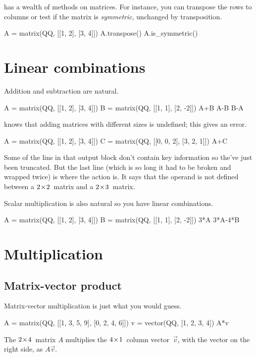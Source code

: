 \Sage{} has a wealth of methods on matrices.
For instance, you can transpose the rows to columns or test if the 
matrix is \textit{symmetric},
unchanged by transposition.
\begin{sageoutput}
A = matrix(QQ, [[1, 2], [3, 4]])
A.transpose()
A.is_symmetric()
\end{sageoutput}




\section{Linear combinations}
Addition and subtraction are natural.
\begin{sageoutput}
A = matrix(QQ, [[1, 2], [3, 4]])
B = matrix(QQ, [[1, 1], [2, -2]])
A+B
A-B
B-A
\end{sageoutput}

\Sage{} knows that adding matrices with different sizes is undefined; 
this gives an error. 
\begin{sageoutput}[s,3,70,-66;s,4,70,-66;s,8,70,-66;s,10,70,-66;s,12,124,14;s,12,70,13]
A = matrix(QQ, [[1, 2], [3, 4]])
C = matrix(QQ, [[0, 0, 2], [3, 2, 1]])
A+C
\end{sageoutput}
\noindent
Some of the lins in that output block don't contain key information so 
the've just been truncated.
But the last line (which is so long it had to be broken and wrapped 
twice) is where the action is.
It says that the \inlinecode{+} operand is not defined between a
$2 \! \times \! 2$~matrix and a $2 \! \times \! 3$~matrix.

Scalar multiplication is also natural
so you have linear combinations.
\begin{sageoutput}[d,0,2]
A = matrix(QQ, [[1, 2], [3, 4]])
B = matrix(QQ, [[1, 1], [2, -2]])
3*A
3*A-4*B
\end{sageoutput}



\section{Multiplication}

\subsection{Matrix-vector product}
Matrix-vector multiplication is just what you would guess.
\begin{sageoutput}
A = matrix(QQ, [[1, 3, 5, 9], [0, 2, 4, 6]])
v = vector(QQ, [1, 2, 3, 4])
A*v
\end{sageoutput}
\noindent
The $2 \! \times \! 4$~matrix $A$ multiplies the 
$4 \! \times \! 1$~column vector~$\vec{v}$, with the vector on the right side,
as $A\vec{v}$.

